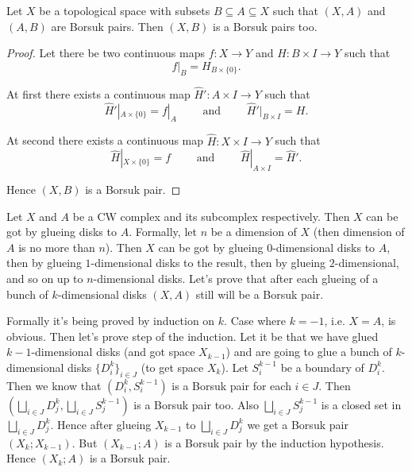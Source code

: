 \documentclass[12pt,a4paper]{article}
\begin{document}
\begin{problem}{21}
        \begin{lemma}
            Let $X$ be a topological space with subsets $B \subseteq A \subseteq X$ such that $(X, A)$ and $(A, B)$ are Borsuk pairs. Then $(X, B)$ is a Borsuk pairs too.
        \end{lemma}

        \begin{proof}
            Let there be two continuous maps $f: X \to Y$ and $H: B \times I \to Y$ such that
            \[f|_{B} = H_{B \times \{0\}}.\]

            At first there exists a continuous map $\widehat{H}': A \times I \to Y$ such that
            \[
                \widehat{H}'|_{A \times \{0\}} = f|_{A}
                \qquad \text{ and } \qquad
                \widehat{H}'|_{B \times I} = H.
            \]

            At second there exists a continuous map $\widehat{H}: X \times I \to Y$ such that
            \[
                \widehat{H}|_{X \times \{0\}} = f
                \qquad \text{ and } \qquad
                \widehat{H}|_{A \times I} = \widehat{H}'.
            \]

            Hence $(X, B)$ is a Borsuk pair.
        \end{proof}

        Let $X$ and $A$ be a CW complex and its subcomplex respectively. Then $X$ can be got by glueing disks to $A$. Formally, let $n$ be a dimension of $X$ (then dimension of $A$ is no more than $n$). Then $X$ can be got by glueing $0$-dimensional disks to $A$, then by glueing $1$-dimensional disks to the result, then by glueing $2$-dimensional, and so on up to $n$-dimensional disks. Let's prove that after each glueing of a bunch of $k$-dimensional disks $(X, A)$ still will be a Borsuk pair.

        Formally it's being proved by induction on $k$. Case where $k = -1$, i.e. $X = A$, is obvious. Then let's prove step of the induction. Let it be that we have glued $k-1$-dimensional disks (and got space $X_{k-1}$) and are going to glue a bunch of $k$-dimensional disks $\{D^k_i\}_{i \in J}$ (to get space $X_k$). Let $S^{k-1}_i$ be a boundary of $D^k_i$. Then we know that $(D^k_i, S^{k-1}_i)$ is a Borsuk pair for each $i \in J$. Then $(\bigsqcup_{i \in J} D^k_j, \bigsqcup_{i \in J} S^{k-1}_j)$ is a Borsuk pair too. Also $\bigsqcup_{i \in J} S^{k-1}_j$ is a closed set in $\bigsqcup_{i \in J} D^k_j$. Hence after glueing $X_{k-1}$ to $\bigsqcup_{i \in J} D^k_j$ we get a Borsuk pair $(X_k; X_{k-1})$. But $(X_{k-1}; A)$ is a Borsuk pair by the induction hypothesis. Hence $(X_k; A)$ is a Borsuk pair.
    \end{problem}
\end{document}

